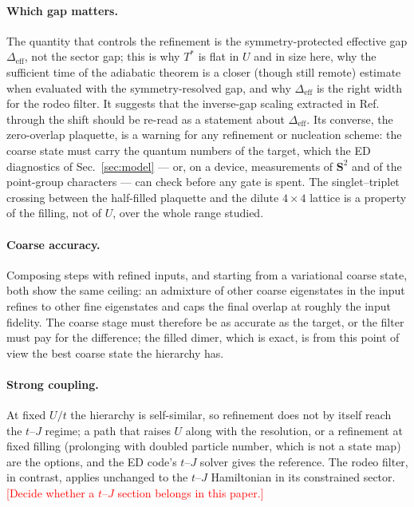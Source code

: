 \documentclass[
  aps,
  prc,
  reprint,
  superscriptaddress,
  floatfix,
  nofootinbib
]{revtex4-2}
\newcommand{\todo}[1]{\textcolor{red}{[#1]}}
\newcommand{\Deff}{\Delta_{\mathrm{eff}}}
\begin{document}
\paragraph{Which gap matters.}
The quantity that controls the refinement is the symmetry-protected
effective gap $\Deff$, not the sector gap; this is why $T^*$ is flat in $U$
and in size here, why the sufficient time of the adiabatic theorem is a
closer (though still remote) estimate when evaluated with the symmetry-resolved
gap, and why $\Deff$ is the right width for the rodeo filter.  It suggests
that the inverse-gap scaling extracted in Ref.~\cite{EigenQPairing2026}
through the shift should be re-read as a statement about $\Deff$.  Its
converse, the zero-overlap plaquette, is a warning for any refinement or
nucleation scheme: the coarse state must carry the quantum numbers of the
target, which the ED diagnostics of Sec.~\ref{sec:model} --- or, on a device,
measurements of $\mathbf S^2$ and of the point-group characters --- can
check before any gate is spent.  The singlet--triplet crossing between the
half-filled plaquette and the dilute $4\times4$ lattice is a property of the
filling, not of $U$, over the whole range studied.

\paragraph{Coarse accuracy.}
Composing steps with refined inputs, and starting from a variational coarse
state, both show the same ceiling: an admixture of other coarse eigenstates
in the input refines to other fine eigenstates and caps the final overlap
at roughly the input fidelity.  The coarse stage must therefore be as
accurate as the target, or the filter must pay for the difference; the
filled dimer, which is exact, is from this point of view the best coarse
state the hierarchy has.

\paragraph{Strong coupling.}
At fixed $U/t$ the hierarchy is self-similar, so refinement does not by
itself reach the $t$--$J$ regime; a path that raises $U$ along with the
resolution, or a refinement at fixed filling (prolonging with doubled
particle number, which is not a state map) are the options, and the ED
code's $t$--$J$ solver gives the reference.  The rodeo filter, in contrast,
applies unchanged to the $t$--$J$ Hamiltonian in its constrained sector.
\todo{Decide whether a $t$--$J$ section belongs in this paper.}
\end{document}
